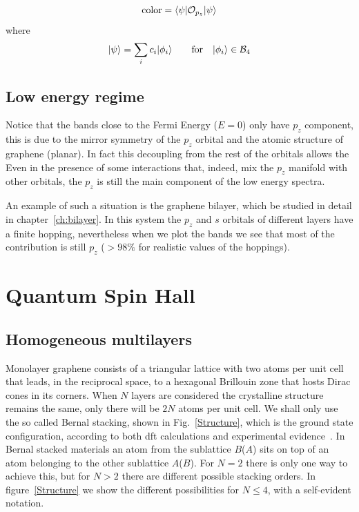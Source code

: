 \begin{equation*}
  \text{color} = \langle\psi|\mathcal{O}_{p_z}|\psi\rangle
\end{equation*}
where
 \begin{equation*}
   |\psi\rangle = \sum_i c_i|\phi_i\rangle \qquad
   \text{for} \quad|\phi_i\rangle\in\mathcal{B}_4
 \end{equation*}



\subsection{Low energy regime}
Notice that the bands close to the Fermi Energy ($E=0$) only have $p_z$ component, this is due to the mirror symmetry of the $p_z$ orbital and the atomic structure of graphene (planar). In fact this decoupling from the rest of the orbitals allows the
Even in the presence of some interactions that, indeed, mix the $p_z$ manifold with other orbitals, the $p_z$ is still the main component of the low energy spectra.

An example of such a situation is the graphene bilayer, which be studied in detail in chapter~\ref{ch:bilayer}. In this system the $p_z$ and $s$ orbitals of different layers have a finite hopping, nevertheless when we plot the bands %
we see that most of the contribution is still $p_z$ ($>98\%$ for realistic values of the hoppings).



\section{Quantum Spin Hall}
\subsection{Homogeneous multilayers}\label{Homogeneous}

Monolayer graphene consists of a triangular lattice with two atoms per unit cell that leads, in the reciprocal space, to a hexagonal Brillouin zone that hosts Dirac cones in its corners.
When $N$ layers are considered the crystalline structure remains the same, only there will be $2N$ atoms per unit cell. We shall only use the so called Bernal stacking, shown in  Fig.~\ref{Structure}, which is the ground state configuration, according to both \ac{dft} calculations and experimental evidence~\cite{Norimatsu2010,Charlier1994,Charlier1994a}. In Bernal stacked materials an atom from the sublattice $B$($A$) sits on top of an atom belonging to the other sublattice $A$($B$).
For $N=2$ there is only one way to achieve this, but for $N>2$ there are different possible stacking orders. In figure~\ref{Structure} we show the different possibilities for $N\leq4$, with a self-evident notation.

